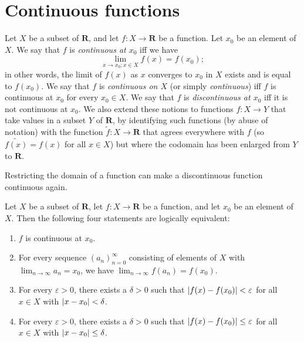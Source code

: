 \section{Continuous functions}\label{sec 9.4}

\begin{definition}[Continuity]\label{9.4.1}
    Let \(X\) be a subset of \(\mathbf{R}\), and let \(f : X \to \mathbf{R}\) be a function.
    Let \(x_0\) be an element of \(X\).
    We say that \(f\) is \emph{continuous at \(x_0\)} iff we have
    \[
        \lim_{x \to x_0 ; x \in X} f(x) = f(x_0);
    \]
    in other words, the limit of \(f(x)\) as \(x\) converges to \(x_0\) in \(X\) exists and is equal to \(f(x_0)\).
    We say that \(f\) is \emph{continuous on \(X\)} (or simply \emph{continuous}) iff \(f\) is continuous at \(x_0\) for every \(x_0 \in X\).
    We say that \(f\) is \emph{discontinuous at \(x_0\)} iff it is not continuous at \(x_0\).
    We also extend these notions to functions \(f : X \to Y\) that take values in a subset \(Y\) of \(\mathbf{R}\), by identifying such functions (by abuse of notation) with the function \(\tilde{f} : X \to \mathbf{R}\) that agrees everywhere with \(f\) (so \(\tilde{f(x)} = f(x)\) for all \(x \in X\)) but where the codomain has been enlarged from \(Y\) to \(\mathbf{R}\).
\end{definition}

\begin{note}
    Restricting the domain of a function can make a discontinuous function continuous again.
\end{note}

\setcounter{theorem}{6}
\begin{proposition}\label{9.4.7}
    Let \(X\) be a subset of \(\mathbf{R}\), let \(f : X \to \mathbf{R}\) be a function, and let \(x_0\) be an element of \(X\).
    Then the following four statements are logically equivalent:
    \begin{enumerate}
        \item \(f\) is continuous at \(x_0\).
        \item For every sequence \((a_n)_{n = 0}^\infty\) consisting of elements of \(X\) with \(\lim_{n \to \infty} a_n = x_0\), we have \(\lim_{n \to \infty} f(a_n) = f(x_0)\).
        \item For every \(\varepsilon > 0\), there exists a \(\delta > 0\) such that \(\abs*{f(x) - f(x_0)} < \varepsilon\) for all \(x \in X\) with \(\abs*{x - x_0} < \delta\).
        \item For every \(\varepsilon > 0\), there exists a \(\delta > 0\) such that \(\abs*{f(x) - f(x_0)} \leq \varepsilon\) for all \(x \in X\) with \(\abs*{x - x_0} \leq \delta\).
    \end{enumerate}
\end{proposition}

